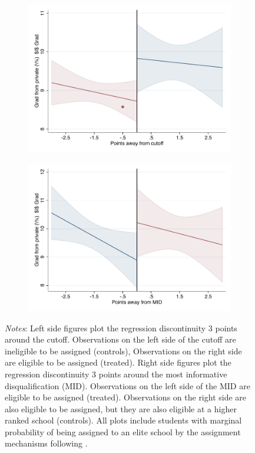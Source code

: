 \documentclass[oneside,11pt]{article}
\begin{document}
\begin{figure}[H]
\begin{center}
    \begin{subfigure}{0.475\textwidth}
        \centering
        \includegraphics[width=\textwidth]{04_Figures/rd_plot_tau_ENLACE_Privado_pdelta3.pdf}
    \end{subfigure}
    \begin{subfigure}{0.475\textwidth}
        \centering
        \includegraphics[width=\textwidth]{04_Figures/rd_plot_mid_ENLACE_Privado_pdelta3.pdf}
    \end{subfigure}
    \end{center}
    
\footnotesize
\textit{Notes}: Left side figures plot the regression discontinuity 3 points around the cutoff. Observations on the left side of the cutoff are ineligible to be assigned (controls), Observations on the right side are eligible to be assigned (treated). Right side figures plot the regression discontinuity 3 points around the most informative disqualification (MID). Observations on the left side of the MID are eligible to be assigned (treated). Observations on the right side are also eligible to be assigned, but they are also eligible at a higher ranked school (controls). All plots include students with marginal probability of being assigned to an elite school by the assignment mechanisms following \citet{abdulkadirouglu2022breaking}. 
\end{figure}
\end{document}
